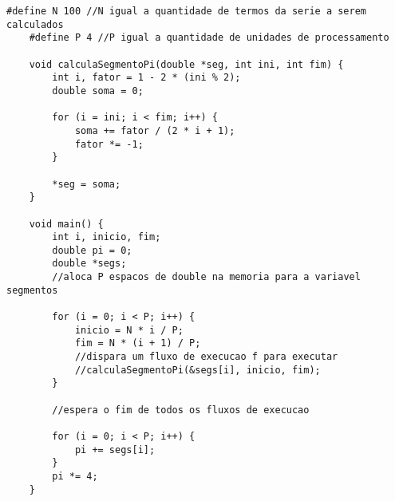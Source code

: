 \documentclass[a4paper, 12pt]{article}
\theoremstyle{dotless}
\begin{document}
\begin{lstlisting}[style=CStyle]
    #define N 100 //N igual a quantidade de termos da serie a serem calculados
    #define P 4 //P igual a quantidade de unidades de processamento

    void calculaSegmentoPi(double *seg, int ini, int fim) {
        int i, fator = 1 - 2 * (ini % 2);
        double soma = 0;
        
        for (i = ini; i < fim; i++) {
            soma += fator / (2 * i + 1);
            fator *= -1;
        }

        *seg = soma;
    }

    void main() {
        int i, inicio, fim;
        double pi = 0;
        double *segs;
        //aloca P espacos de double na memoria para a variavel segmentos

        for (i = 0; i < P; i++) {
            inicio = N * i / P;
            fim = N * (i + 1) / P;
            //dispara um fluxo de execucao f para executar
            //calculaSegmentoPi(&segs[i], inicio, fim);
        }

        //espera o fim de todos os fluxos de execucao

        for (i = 0; i < P; i++) {
            pi += segs[i];
        }
        pi *= 4;
    }
\end{lstlisting}

\newpage
\end{document}
